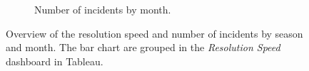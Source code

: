 \begin{figure}[h!]
\begin{subfigure}{0.55\textwidth}
        \caption{Number of incidents by month.}
        \label{fig:3_3_resolution_speed_by_month}
        \vspace*{3mm}        
    \end{subfigure}
    \caption{Overview of the resolution speed and number of incidents by season and month. The bar chart are grouped in the \textit{Resolution Speed} dashboard in Tableau.}
    \label{fig:3_3_resolution_speed_by_season_and_month}
\end{figure}
